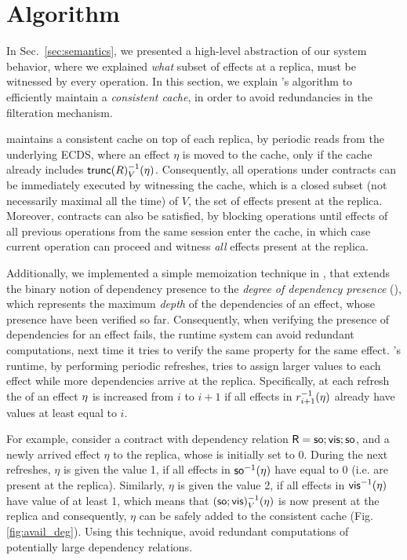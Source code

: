 \section{Algorithm}
\label{sec:alg}

In Sec.~\ref{sec:semantics}, we presented a high-level
abstraction of our system behavior, where we explained \emph{what} subset of
effects at a replica, must be witnessed by every operation. In this
section, we explain \tool's algorithm to efficiently maintain a \emph{consistent
cache}, in order to avoid redundancies in the filteration mechanism.

\tool maintains a consistent cache on top of each replica, by periodic
reads from the underlying ECDS, where an effect $\eta$ is moved to the
cache, only  if the cache already includes {\footnotesize
$\trunc{R}_V^{-1}(\eta)$}. Consequently, all operations under \UB{}
contracts can be immediately executed
by witnessing the cache, which is a closed subset (not necessarily maximal all the time) 
of $V$, the set of effects present at the replica. 
Moreover, \LB{} contracts can also be satisfied, by blocking  operations 
until effects of all previous operations from the same session enter
the cache, in which case current operation can proceed and witness \emph{all}
effects present at the replica.

Additionally, we implemented a simple memoization technique in \tool,
that extends the binary notion of dependency presence to the
\emph{degree of dependency presence} (\DDP{}), which represents 
the maximum \emph{depth} of the dependencies of an effect, whose presence have been
verified so far. 
Consequently, when verifying the presence of
dependencies for an effect fails, the runtime system can avoid redundant
computations, next time it tries to verify the same property for the
same effect.
\tool's runtime, by performing
periodic \DDP{} refreshes, tries to assign larger \DDP{} values to each effect
while more dependencies arrive at the replica. 
Specifically, at each refresh the \DDP{} of an effect $\eta$ is increased from $i$ to $i+1$ if
all effects in $r_{i+1}^{-1}(\eta)$ already have \DDP{} values at least
equal to $i$.

For example, consider a contract with dependency relation
${\normalfont \textsf{R}}={\textsf{so}};{\normalfont \textsf{vis}};{\textsf{so}}$, and a newly arrived effect $\eta$ to the
replica, whose \DDP{} is initially set to 0. 
During the next refreshes, $\eta$ is given the value 1, if all
effects in ${\textsf{so}}^{-1}(\eta)$ have \DDP{} equal to 0 (i.e. are present at the
replica). Similarly, $\eta$ is given the value 2, if all effects in
${\normalfont \textsf{vis}}^{-1}(\eta)$ have \DDP{} value of at least 1, which means that 
$({\textsf{so}};{\normalfont \textsf{vis}})^{-1}_V(\eta)$ is now present at the replica and
consequently, $\eta$ can
be safely added to the consistent cache (Fig.\ref{fig:avail_deg}).
Using this technique, \tool avoid redundant computations of potentially large
dependency relations.

